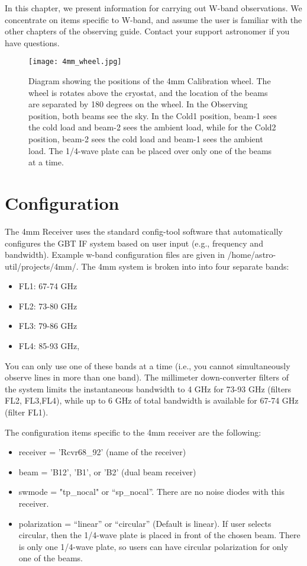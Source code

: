 In this chapter, we present information for carrying out W-band
observations.  We concentrate on items specific to W-band, and assume
the user is familiar with the other chapters of the observing guide.
Contact your support astronomer if you have questions.

\begin{figure}[!h]
\begin{center}
\texttt{[image: 4mm\_wheel.jpg]}
\caption[]{Diagram showing the positions of the 4mm Calibration wheel.
  The wheel is rotates above the cryostat, and the location of the
  beams are separated by 180 degrees on the wheel.  In the Observing
  position, both beams see the sky.  In the Cold1 position, beam-1
  sees the cold load and beam-2 sees the ambient load, while for the
  Cold2 position, beam-2 sees the cold load and beam-1 sees the
  ambient load. The 1/4-wave plate can be placed over only one of the
  beams at a time.  \label{fig:4mmwheel} }
\end{center}
\end{figure}

\section{Configuration}

The 4mm Receiver uses the standard config-tool software that
automatically configures the GBT IF system based on user input (e.g.,
frequency and bandwidth).  Example w-band configuration files are
given in /home/astro-util/projects/4mm/.  The 4mm system is broken
into into four separate bands:

\begin{itemize}
\item    FL1: 67-74 GHz
\item    FL2: 73-80 GHz
\item    FL3: 79-86 GHz
\item FL4: 85-93 GHz,
\end{itemize}

You can only use one of these bands at a time (i.e., you cannot
simultaneously observe lines in more than one band).  The millimeter
down-converter filters of the system limits the instantaneous
bandwidth to 4 GHz for 73-93 GHz (filters FL2, FL3,FL4), while up to 6
GHz of total bandwidth is available for 67-74 GHz (filter FL1).

The configuration items specific to the 4mm receiver are the following:

\begin{itemize}
\item receiver  = 'Rcvr68\_92'  (name of the receiver)
\item beam      = 'B12', 'B1', or 'B2' (dual beam receiver)
\item swmode    = "tp\_nocal"  or ``sp\_nocal''.  There are no noise
  diodes with this receiver. 
\item polarization = ``linear'' or ``circular'' (Default is linear). If
  user selects circular, then the 1/4-wave plate is placed in front of
  the chosen beam.  There is only one 1/4-wave plate, so users can
  have circular polarization for only one of the beams.
\end{itemize}

